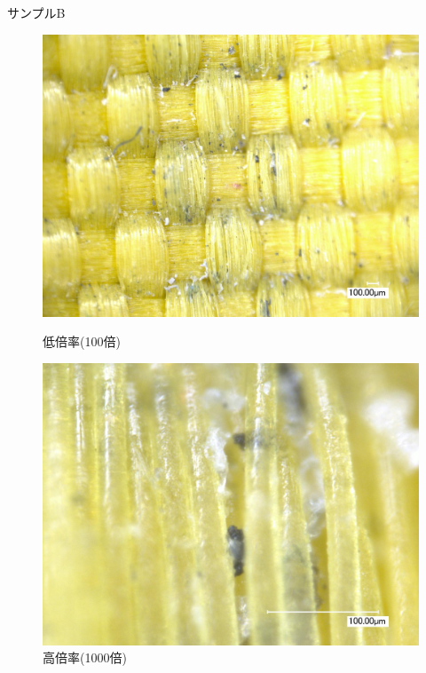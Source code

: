 \documentclass[main]{subfiles}
\begin{document}
\begin{itemize}
    サンプルB
    \begin{figure}[H]
        \centering
        \begin{minipage}[htbp]{0.45\linewidth}
            \centering
            \includegraphics[keepaspectratio, width=0.8\linewidth]{figures/縁/カーリングパッド10-15低倍率B.jpg}
            \caption{低倍率(100倍)}
            \label{fig:label}
        \end{minipage}
        \begin{minipage}[htbp]{0.45\linewidth}
            \centering
            \includegraphics[keepaspectratio, width=0.8\linewidth]{figures/縁/カーリングパッド10-15B.jpg}
            \caption{高倍率(1000倍)}
            \label{fig:label}
        \end{minipage}
    \end{figure}


\end{itemize}
\end{document}
